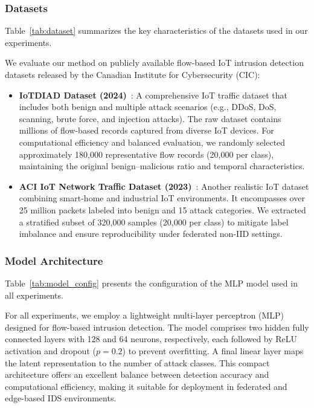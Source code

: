 \subsubsection{Datasets}

Table~\ref{tab:dataset} summarizes the key characteristics of the datasets used in our experiments.

We evaluate our method on publicly available flow-based IoT intrusion detection datasets released by the Canadian Institute for Cybersecurity (CIC):

\begin{itemize}
    \item \textbf{IoTDIAD Dataset (2024)}~\cite{IoTDIAD2024}: 
    A comprehensive IoT traffic dataset that includes both benign and multiple attack scenarios 
    (e.g., DDoS, DoS, scanning, brute force, and injection attacks). 
    The raw dataset contains millions of flow-based records captured from diverse IoT devices. 
    For computational efficiency and balanced evaluation, we randomly selected 
    approximately 180,000 representative flow records (20,000 per class), 
    maintaining the original benign–malicious ratio and temporal characteristics.

    \item \textbf{ACI IoT Network Traffic Dataset (2023)}~\cite{ACI2023}: 
    Another realistic IoT dataset combining smart-home and industrial IoT environments. 
    It encompasses over 25 million packets labeled into benign and 15 attack categories. 
    We extracted a stratified subset of 320,000 samples (20,000 per class) 
    to mitigate label imbalance and ensure reproducibility under federated non-IID settings.
\end{itemize}

\subsubsection{Model Architecture}

Table~\ref{tab:model_config} presents the configuration of the MLP model used in all experiments.

For all experiments, we employ a lightweight multi-layer perceptron (MLP) 
designed for flow-based intrusion detection. 
The model comprises two hidden fully connected layers with 128 and 64 neurons, respectively,
each followed by ReLU activation and dropout ($p=0.2$) to prevent overfitting. 
A final linear layer maps the latent representation to the number of attack classes. 
This compact architecture offers an excellent balance between detection accuracy 
and computational efficiency, making it suitable for deployment 
in federated and edge-based IDS environments.

